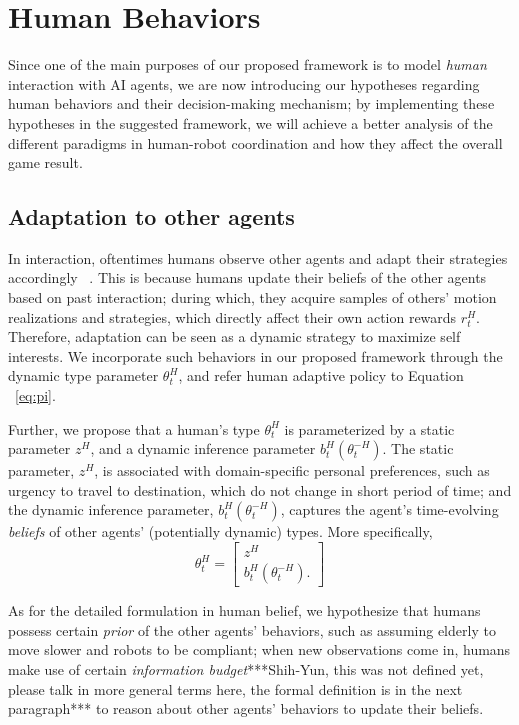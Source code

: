 \documentclass[letterpaper, 10 pt, conference]{ieeeconf}  %
\begin{document}
\section{Human Behaviors}\label{sec:human_behavior}
Since one of the main purposes of our proposed framework is to model 
\textit{human} interaction with AI agents, we are now introducing our 
hypotheses regarding human behaviors and their decision-making mechanism; by implementing these hypotheses in the suggested framework, we will achieve a better analysis of the different paradigms in human-robot coordination and how they affect the overall game result.
\vspace{-.2em}
\subsection{Adaptation to other agents}\label{sec:adaptability}
\vspace{-.2em}
In interaction, oftentimes humans observe other agents and adapt their 
strategies accordingly ~\cite{nikolaidis2016formalizing,yang2017evaluating}. 
This is because humans update their beliefs of the other agents based on past interaction; during which, they acquire samples of others' motion realizations 
and strategies, which directly affect their own action rewards $r^H_t$. 
Therefore, adaptation can be seen as a dynamic strategy to maximize self 
interests. We incorporate such behaviors in our proposed framework 
through the dynamic type parameter $\theta^H_t$, and refer human adaptive 
policy to Equation ~\ref{eq:pi}. 

Further, we propose that a human's type $\theta^H_t$ is parameterized by a 
static parameter $z^H$, and a dynamic inference parameter 
$b^H_t(\theta^{-H}_t)$. The static parameter, $z^H$, is associated with 
domain-specific personal 
preferences, such as urgency to travel to destination, which do not change in 
short period of time; and the 
dynamic inference parameter, $b^H_t(\theta^{-H}_t)$, captures the agent's 
time-evolving \textit{beliefs} of other agents' (potentially dynamic) types. More specifically,
\begin{equation}
  \theta^H_t = \begin{bmatrix}
    z^H \\
    b^H_t(\theta^{-H}_t).
  \end{bmatrix}
\end{equation}

As for the detailed formulation in human belief, we hypothesize that humans 
possess certain \textit{prior} of the other agents' behaviors, such as assuming 
elderly to move slower and robots to be compliant; when new observations come 
in, humans make use of certain \textit{information budget}***Shih-Yun, this was not defined yet, please talk in more general terms here, the formal definition is in the next paragraph*** to reason about 
other agents' behaviors to update their beliefs.
\end{document}

